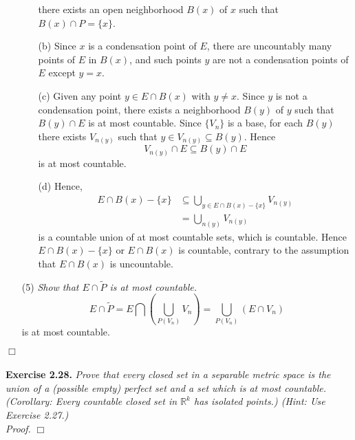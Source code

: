 \documentclass{article}
\begin{document}
\begin{enumerate}
\begin{enumerate}
  there exists an open neighborhood $B(x)$ of $x$ such that $B(x) \cap P = \{x\}$.
  \item[(b)]
  Since $x$ is a condensation point of $E$,
  there are uncountably many points of $E$ in $B(x)$,
  and such points $y$ are not a condensation points of $E$ except $y = x$.
  \item[(c)]
  Given any point $y \in E \cap B(x)$ with $y \neq x$.
  Since $y$ is not a condensation point,
  there exists a neighborhood $B(y)$ of $y$ such that $B(y) \cap E$ is at most countable.
  Since $\{V_n\}$ is a base,
  for each $B(y)$ there exists $V_{n(y)}$ such that $y \in V_{n(y)} \subseteq B(y)$.
  Hence $$V_{n(y)} \cap E \subseteq B(y) \cap E$$
  is at most countable.
  \item[(d)]
  Hence,
  \begin{align*}
  E \cap B(x) - \{x\}
  &\subseteq \bigcup_{y \in E \cap B(x) - \{x\}} V_{n(y)}  \\
  &= \bigcup_{n(y)} V_{n(y)}
  \end{align*}
  is a countable union of at most countable sets,
  which is countable.
  Hence $E \cap B(x) - \{x\}$ or $E \cap B(x)$ is countable,
  contrary to the assumption that $E \cap B(x)$ is uncountable.
  \end{enumerate}
\item[(5)]
\emph{Show that $E \cap \widetilde{P}$ is at most countable.}
$$E \cap \widetilde{P}
= E \bigcap \left(\bigcup_{P(V_n)} V_n\right)
= \bigcup_{P(V_n)}(E \cap V_n)$$
is at most countable.
\end{enumerate}

$\Box$ \\\\






\textbf{Exercise 2.28.}
\emph{Prove that every closed set in a separable metric space is
the union of a (possible empty) perfect set and a set which is at most
countable.
(Corollary: Every countable closed set in $\mathbb{R}^k$ has isolated points.)
(Hint: Use Exercise 2.27.) } \\

\emph{Proof.}
$\Box$ \\\\



\end{document}
